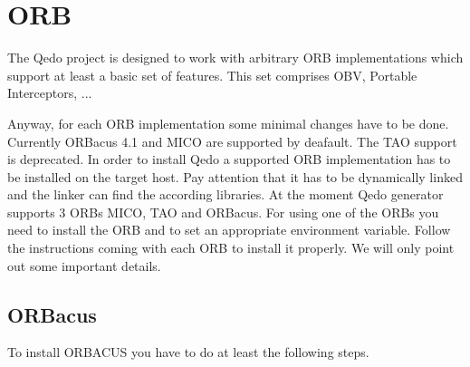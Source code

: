 \documentclass[12pt,a4paper]{report}
\begin{document}
\section{ORB}
\label{sec:ORB}
The Qedo project is designed to work with arbitrary ORB implementations which support at least a basic set of features. This set comprises OBV, Portable Interceptors, ...

Anyway, for each ORB implementation some minimal changes have to be done. Currently ORBacus 4.1 and MICO are supported by deafault. The TAO support is deprecated. In order to install Qedo a supported ORB implementation has to be installed on the target host. Pay attention that it has to be dynamically linked and the linker can find the according libraries. At the moment Qedo generator supports 3 ORBs MICO, TAO and ORBacus. For using one of the ORBs you need to install the ORB and to set an appropriate environment variable. Follow the instructions coming with each ORB to install it properly. We will only point out some important details.

\subsection{ORBacus}
\label{sec:ORBacus}
To install ORBACUS you have to do at least the following steps.
\end{document}
